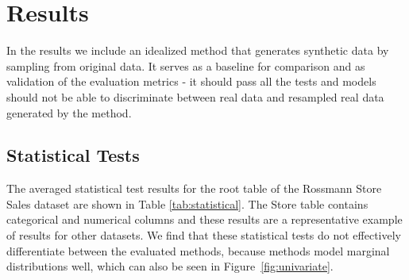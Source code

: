 \documentclass[fleqn,moreauthors,10pt]{ds_report}
\begin{document}

\section{Results}

In the results we include an idealized method that generates synthetic data by sampling from original data. It serves as a baseline for comparison and as validation of the evaluation metrics - it should pass all the tests and models should not be able to discriminate between real data and resampled real data generated by the method.

\subsection{Statistical Tests}
\begin{table}[!ht]
\centering
{}
    \caption{\textbf{Statistical test results on the root table of the Rossmann dataset.} We report the cross-validation means and standard erros of the Kolmogorv-Smirnov test (KS), Jensen-Shannon distance (JS), Maximum Mean Discrepancy (MMD) and Chi-squared test. We omit the leading zeros.}
    \label{tab:statistical}
\end{table}

The averaged statistical test results for the root table of the Rossmann Store Sales dataset are shown in Table \ref{tab:statistical}. The Store table contains categorical and numerical columns and these results are a representative example of results for other datasets. We find that these statistical tests do not effectively differentiate between the evaluated methods, because methods model marginal distributions well, which can also be seen in Figure~\ref{fig:univariate}.
\end{document}
